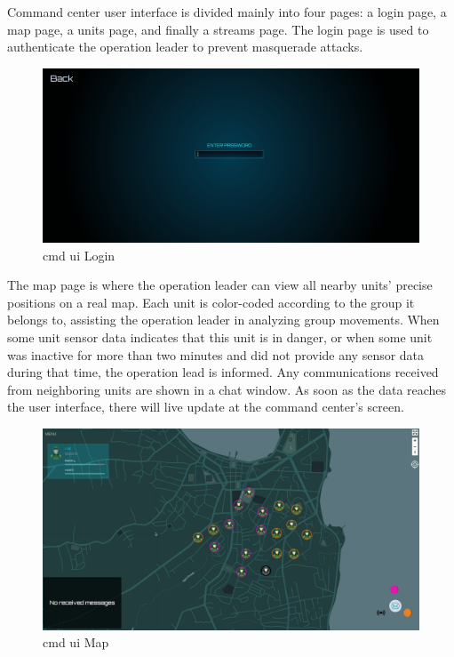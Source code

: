 Command center user interface is divided mainly into four pages: a login page, a map page, a units page, and finally a streams page. 
The login page is used to authenticate the operation leader to prevent masquerade attacks.

\begin{figure}
    \centering
    \includegraphics[width=15cm]{images/cmd-ui-login.png}
    \caption{\acrshort{cmd} \acrshort{ui} Login}
    \label{fig:cmd-ui-login}
\end{figure}


The map page is where the operation leader can view all nearby units' precise positions on a real map. Each unit is color-coded according to the group it belongs to, assisting the operation leader in analyzing group movements. When some unit sensor data indicates that this unit is in danger, or when some unit was inactive for more than two minutes and did not provide any sensor data during that time, the operation lead is informed. Any communications received from neighboring units are shown in a chat window. As soon as the data reaches the user interface, there will live update at the command center's screen. 

\begin{figure}
    \centering
    \includegraphics[width=15cm]{images/cmd-ui-map.png}
    \caption{\acrshort{cmd} \acrshort{ui} Map}
    \label{fig:cmd-ui-map}
\end{figure}


